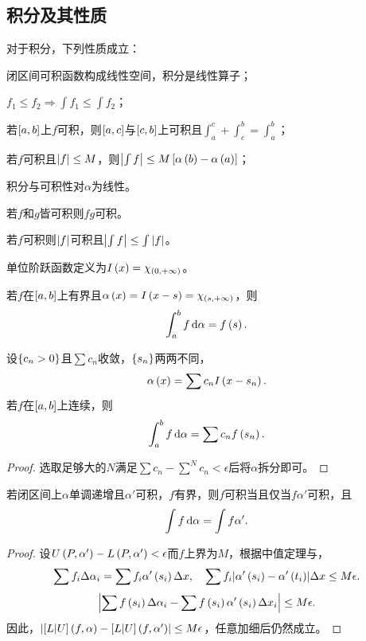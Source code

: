 \documentclass{ctexrep}
\begin{document}
  \subsection{积分及其性质}
  \begin{theorem}
    对于积分，下列性质成立：
    \begin{cenum}
      \item 闭区间可积函数构成线性空间，积分是线性算子；
      \item $f_1\le f_2\Rightarrow \int f_1 \le \int f_2$；
      \item 若$\left[a,b\right]$上$f$可积，则$\left[a,c\right]$与$\left[c,b\right]$上可积且$\int_a^c + \int_c^b=\int_a^b$；
      \item 若$f$可积且$\abs{f}\le M$，则$\abs{\int f} \le M \left[\alpha\left(b\right)-\alpha\left(a\right)\right]$；
      \item 积分与可积性对$\alpha$为线性。
    \end{cenum}
  \end{theorem}
  \begin{theorem}
    若$f$和$g$皆可积则$fg$可积。
  \end{theorem}
  \begin{theorem}
    若$f$可积则$\abs{f}$可积且$\abs{\int f}\le \int \abs{f}$。
  \end{theorem}
  \begin{definition}
    单位阶跃函数定义为$I\left(x\right)=\chi_{\left(0,+\infty\right)}$。
  \end{definition}
  \begin{definition}
    若$f$在$\left[a,b\right]$上有界且$\alpha\left(x\right)=I\left(x-s\right)=\chi_{\left(s,+\infty\right)}$，则
    \[ \int_{a}^{b} f \, \mathrm{d} \alpha = f\left(s\right). \]
  \end{definition}
  \begin{theorem}
    设$\left\{c_n>0\right\}$且$\sum c_n$收敛，$\left\{s_n\right\}$两两不同，
    \[ \alpha\left(x\right) = \sum c_n I\left(x-s_n\right). \]
    若$f$在$\left[a,b\right]$上连续，则
    \[ \int_a^b f\, \mathrm{d} \alpha = \sum c_n f\left(s_n\right). \]
  \end{theorem}
  \begin{proof}
    选取足够大的$N$满足$\sum c_n-\sum^N c_n < \epsilon$后将$\alpha$拆分即可。
  \end{proof}
  \begin{theorem}
    若闭区间上$\alpha$单调递增且$\alpha'$可积，$f$有界，则$f$可积当且仅当$f\alpha'$可积，且
    \[ \int f\, \mathrm{d} \alpha = \int f\alpha'. \]
  \end{theorem}
  \begin{proof}
    设$U\left(P,\alpha'\right)-L\left(P,\alpha'\right)<\epsilon$而$f$上界为$M$，根据中值定理与，
    \[ \sum f_i\Delta\alpha_i = \sum f_i\alpha'\left(s_i\right)\Delta x, \quad \sum f_i \abs{\alpha'\left(s_i\right) - \alpha'\left(t_i\right)} \Delta x \le M\epsilon. \]
    \[ \abs{\sum f\left(s_i\right)\Delta\alpha_i - \sum f\left(s_i\right)\alpha'\left(s_i\right)\Delta x_i} \le M\epsilon. \]
    因此，$\abs{\left[L | U\right]\left(f,\alpha\right)-\left[L | U\right]\left(f,\alpha'\right)}\le M\epsilon$，任意加细后仍然成立。
  \end{proof}
\end{document}
